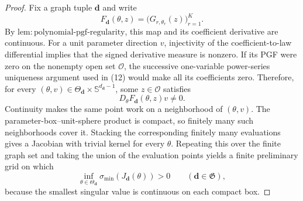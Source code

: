 \documentclass{article}
\begin{document}
\begin{proof}
Fix a graph tuple \(\boldsymbol d\) and write
\[
 F_{\boldsymbol d}(\theta,z)
 =\bigl(G_{r,\theta_r}(z)\bigr)_{r=1}^{K}.
\]
By \(\mathrm{lem{:}polynomial\text{-}pgf\text{-}regularity}\), this map and its coefficient derivative are continuous.  For a unit parameter direction \(v\), injectivity of the coefficient-to-law differential implies that the signed derivative measure is nonzero.  If its PGF were zero on the nonempty open set \(\mathcal O\), the successive one-variable power-series uniqueness argument used in (12) would make all its coefficients zero.  Therefore, for every \((\theta,v)\in\Theta_{\boldsymbol d}\times\mathbb S^{d_{\boldsymbol d}-1}\), some \(z\in\mathcal O\) satisfies
\[
 D_\theta F_{\boldsymbol d}(\theta,z)v\ne0. \tag{13}
\]
Continuity makes the same point work on a neighborhood of \((\theta,v)\).  The parameter-box--unit-sphere product is compact, so finitely many such neighborhoods cover it.  Stacking the corresponding finitely many evaluations gives a Jacobian with trivial kernel for every \(\theta\).  Repeating this over the finite graph set and taking the union of the evaluation points yields a finite preliminary grid on which
\[
 \inf_{\theta\in\Theta_{\boldsymbol d}}
 \sigma_{\min}(J_{\boldsymbol d}(\theta))>0
 \qquad(\boldsymbol d\in\mathfrak G), \tag{14}
\]
because the smallest singular value is continuous on each compact box.


\end{proof}
\end{document}
